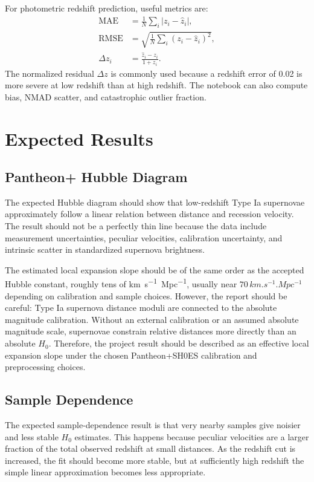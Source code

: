 \documentclass[11pt,a4paper]{article}
\begin{document}
For photometric redshift prediction, useful metrics are:
\begin{align}
    \mathrm{MAE} &= \frac{1}{N}\sum_i |z_i - \hat{z}_i|, \\
    \mathrm{RMSE} &= \sqrt{\frac{1}{N}\sum_i (z_i - \hat{z}_i)^2}, \\
    \Delta z_i &= \frac{\hat{z}_i - z_i}{1 + z_i}.
\end{align}
The normalized residual $\Delta z$ is commonly used because a redshift error of 0.02 is more severe at low redshift than at high redshift. The notebook can also compute bias, NMAD scatter, and catastrophic outlier fraction.

\section{Expected Results}

\subsection{Pantheon+ Hubble Diagram}

The expected Hubble diagram should show that low-redshift Type Ia supernovae approximately follow a linear relation between distance and recession velocity. The result should not be a perfectly thin line because the data include measurement uncertainties, peculiar velocities, calibration uncertainty, and intrinsic scatter in standardized supernova brightness.

The estimated local expansion slope should be of the same order as the accepted Hubble constant, roughly tens of \si{km.s^{-1}.Mpc^{-1}}, usually near $70\,\si{km.s^{-1}.Mpc^{-1}}$ depending on calibration and sample choices. However, the report should be careful: Type Ia supernova distance moduli are connected to the absolute magnitude calibration. Without an external calibration or an assumed absolute magnitude scale, supernovae constrain relative distances more directly than an absolute $H_0$. Therefore, the project result should be described as an effective local expansion slope under the chosen Pantheon+SH0ES calibration and preprocessing choices.

\subsection{Sample Dependence}

The expected sample-dependence result is that very nearby samples give noisier and less stable $H_0$ estimates. This happens because peculiar velocities are a larger fraction of the total observed redshift at small distances. As the redshift cut is increased, the fit should become more stable, but at sufficiently high redshift the simple linear approximation becomes less appropriate.
\end{document}
